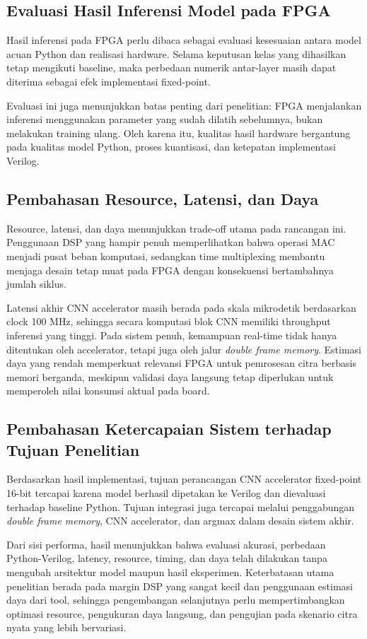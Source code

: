     \subsection{Evaluasi Hasil Inferensi Model pada FPGA}

Hasil inferensi pada FPGA perlu dibaca sebagai evaluasi kesesuaian antara model acuan Python dan realisasi hardware. Selama keputusan kelas yang dihasilkan tetap mengikuti baseline, maka perbedaan numerik antar-layer masih dapat diterima sebagai efek implementasi fixed-point.

Evaluasi ini juga menunjukkan batas penting dari penelitian: FPGA menjalankan inferensi menggunakan parameter yang sudah dilatih sebelumnya, bukan melakukan training ulang. Oleh karena itu, kualitas hasil hardware bergantung pada kualitas model Python, proses kuantisasi, dan ketepatan implementasi Verilog.
    \subsection{Pembahasan Resource, Latensi, dan Daya}

Resource, latensi, dan daya menunjukkan trade-off utama pada rancangan ini. Penggunaan DSP yang hampir penuh memperlihatkan bahwa operasi MAC menjadi pusat beban komputasi, sedangkan time multiplexing membantu menjaga desain tetap muat pada FPGA dengan konsekuensi bertambahnya jumlah siklus.

Latensi akhir CNN accelerator masih berada pada skala mikrodetik berdasarkan clock 100 MHz, sehingga secara komputasi blok CNN memiliki throughput inferensi yang tinggi. Pada sistem penuh, kemampuan real-time tidak hanya ditentukan oleh accelerator, tetapi juga oleh jalur \emph{double frame memory}. Estimasi daya yang rendah memperkuat relevansi FPGA untuk pemrosesan citra berbasis memori berganda, meskipun validasi daya langsung tetap diperlukan untuk memperoleh nilai konsumsi aktual pada board.
	\subsection{Pembahasan Ketercapaian Sistem terhadap Tujuan Penelitian}

Berdasarkan hasil implementasi, tujuan perancangan CNN accelerator fixed-point 16-bit tercapai karena model berhasil dipetakan ke Verilog dan dievaluasi terhadap baseline Python. Tujuan integrasi juga tercapai melalui penggabungan \emph{double frame memory}, CNN accelerator, dan argmax dalam desain sistem akhir.

Dari sisi performa, hasil menunjukkan bahwa evaluasi akurasi, perbedaan Python-Verilog, latency, resource, timing, dan daya telah dilakukan tanpa mengubah arsitektur model maupun hasil eksperimen. Keterbatasan utama penelitian berada pada margin DSP yang sangat kecil dan penggunaan estimasi daya dari tool, sehingga pengembangan selanjutnya perlu mempertimbangkan optimasi resource, pengukuran daya langsung, dan pengujian pada skenario citra nyata yang lebih bervariasi.
